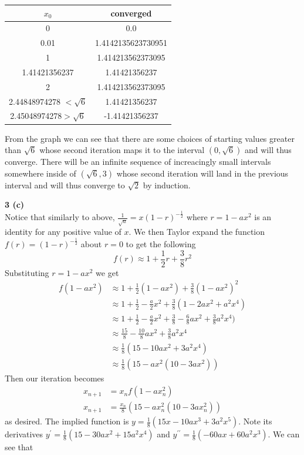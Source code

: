 \documentclass[12pt]{article}
\newcommand{\problem}[1]{\hspace{-4 ex} \large \textbf{#1}\\}
\begin{document}
	\singlespacing
	\begin{center}
		\begin{tabular}{|c|c|}
			\hline
			$x_0$&converged\\ \hline
			0&0.0\\ \hline
			0.01&1.4142135623730951\\ \hline
			1&1.414213562373095\\ \hline
			1.41421356237&1.41421356237\\ \hline
			2&1.414213562373095\\ \hline
			2.44848974278 $<\sqrt{6}$&1.41421356237\\ \hline
			2.45048974278$>\sqrt{6}$&-1.41421356237\\ \hline
		\end{tabular}
	\end{center}
	\doublespacing
	
	From the graph we can see that there are some choices of starting values greater than $\sqrt{6}$ whose second iteration maps it to the interval $(0,\sqrt{6})$ and will thus converge. There will be an infinite sequence of increacingly small intervals somewhere inside of $(\sqrt{6}, 3)$ whose second iteration will land in the previous interval and will thus converge to $\sqrt{2}$ by induction. 
	
	
\problem{3 (c)}
	Notice that similarly to above, $\frac{1}{\sqrt{a}}=x(1-r)^{-\frac{1}{2}}$ where $r=1-ax^2$ is an identity for any positive value of $x$. We then Taylor expand the function $f(r)=(1-r)^{-\frac{1}{2}}$ about $r=0$ to get the following
	$$
	f(r) \approx 1 + \frac{1}{2}r + \frac{3}{8}r^2
	$$
	Substituting $r=1-ax^2$ we get
	\begin{align*}
		f(1-ax^2) & \approx 1 + \frac{1}{2}(1-ax^2) + \frac{3}{8}(1-ax^2)^2\\
		& \approx 1 + \frac{1}{2} - \frac{a}{2}x^2 + \frac{3}{8}(1-2ax^2 + a^2x^4) \\
		& \approx 1 + \frac{1}{2} - \frac{a}{2}x^2 + \frac{3}{8} -\frac{6}{8}ax^2 + \frac{3}{8}a^2x^4) \\
		& \approx \frac{15}{8} - \frac{10}{8}ax^2 + \frac{3}{8}a^2x^4\\
		& \approx \frac{1}{8}(15 - 10ax^2 + 3a^2x^4)\\
		& \approx \frac{1}{8}(15 - ax^2(10 - 3ax^2))
	\end{align*}
	Then our iteration becomes
	\begin{align*}
		x_{n+1} & = x_nf(1-ax_n^2) \\
		x_{n+1} & = \frac{x_n}{8}(15 - ax_n^2(10 - 3ax_n^2))
	\end{align*}
	as desired. The implied function is $y=\frac{1}{8}(15x - 10ax^3 + 3a^2x^5)$. Note its derivatives $y^\prime = \frac{1}{8}(15 - 30ax^2 + 15a^2x^4)$ and $y^{\prime\prime} = \frac{1}{8}(-60ax + 60a^2x^3)$. We can see that
	
\end{document}
